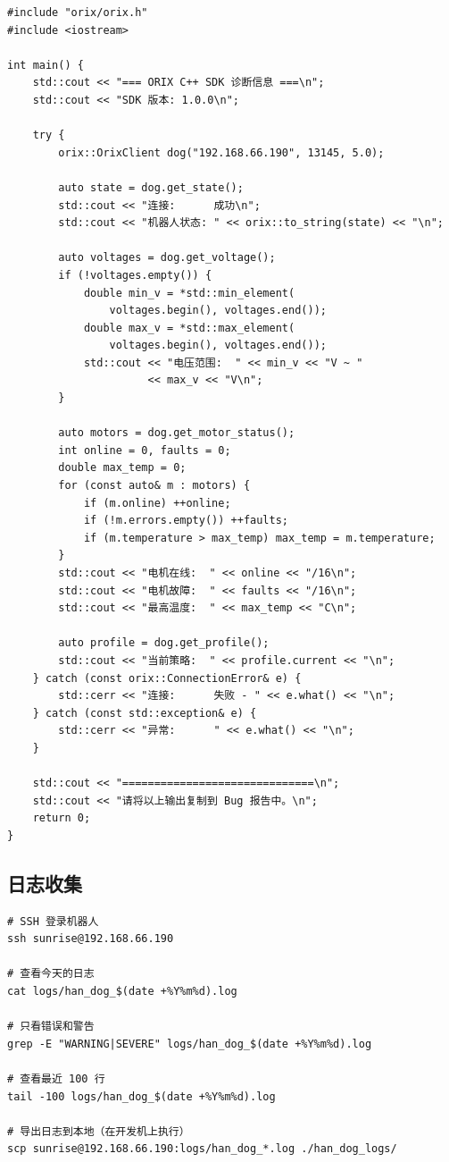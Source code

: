 \documentclass[a4paper,11pt,openany]{book}
\begin{document}
\begin{lstlisting}[style=cpp]
#include "orix/orix.h"
#include <iostream>

int main() {
    std::cout << "=== ORIX C++ SDK 诊断信息 ===\n";
    std::cout << "SDK 版本: 1.0.0\n";

    try {
        orix::OrixClient dog("192.168.66.190", 13145, 5.0);

        auto state = dog.get_state();
        std::cout << "连接:      成功\n";
        std::cout << "机器人状态: " << orix::to_string(state) << "\n";

        auto voltages = dog.get_voltage();
        if (!voltages.empty()) {
            double min_v = *std::min_element(
                voltages.begin(), voltages.end());
            double max_v = *std::max_element(
                voltages.begin(), voltages.end());
            std::cout << "电压范围:  " << min_v << "V ~ "
                      << max_v << "V\n";
        }

        auto motors = dog.get_motor_status();
        int online = 0, faults = 0;
        double max_temp = 0;
        for (const auto& m : motors) {
            if (m.online) ++online;
            if (!m.errors.empty()) ++faults;
            if (m.temperature > max_temp) max_temp = m.temperature;
        }
        std::cout << "电机在线:  " << online << "/16\n";
        std::cout << "电机故障:  " << faults << "/16\n";
        std::cout << "最高温度:  " << max_temp << "C\n";

        auto profile = dog.get_profile();
        std::cout << "当前策略:  " << profile.current << "\n";
    } catch (const orix::ConnectionError& e) {
        std::cerr << "连接:      失败 - " << e.what() << "\n";
    } catch (const std::exception& e) {
        std::cerr << "异常:      " << e.what() << "\n";
    }

    std::cout << "==============================\n";
    std::cout << "请将以上输出复制到 Bug 报告中。\n";
    return 0;
}
\end{lstlisting}

\subsection{日志收集}

\begin{lstlisting}[style=bash]
# SSH 登录机器人
ssh sunrise@192.168.66.190

# 查看今天的日志
cat logs/han_dog_$(date +%Y%m%d).log

# 只看错误和警告
grep -E "WARNING|SEVERE" logs/han_dog_$(date +%Y%m%d).log

# 查看最近 100 行
tail -100 logs/han_dog_$(date +%Y%m%d).log

# 导出日志到本地（在开发机上执行）
scp sunrise@192.168.66.190:logs/han_dog_*.log ./han_dog_logs/
\end{lstlisting}
\end{document}

